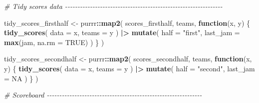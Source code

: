 \documentclass[
]{article}
\newenvironment{Shaded}{\begin{snugshade}}{\end{snugshade}}
\newcommand{\AttributeTok}[1]{\textcolor[rgb]{0.13,0.29,0.53}{#1}}
\newcommand{\CommentTok}[1]{\textcolor[rgb]{0.56,0.35,0.01}{\textit{#1}}}
\newcommand{\ConstantTok}[1]{\textcolor[rgb]{0.56,0.35,0.01}{#1}}
\newcommand{\ControlFlowTok}[1]{\textcolor[rgb]{0.13,0.29,0.53}{\textbf{#1}}}
\newcommand{\FunctionTok}[1]{\textcolor[rgb]{0.13,0.29,0.53}{\textbf{#1}}}
\newcommand{\NormalTok}[1]{#1}
\newcommand{\OtherTok}[1]{\textcolor[rgb]{0.56,0.35,0.01}{#1}}
\newcommand{\SpecialCharTok}[1]{\textcolor[rgb]{0.81,0.36,0.00}{\textbf{#1}}}
\newcommand{\StringTok}[1]{\textcolor[rgb]{0.31,0.60,0.02}{#1}}
\begin{document}
\begin{Shaded}
\begin{Highlighting}[]
\CommentTok{\# Tidy scores data {-}{-}{-}{-}{-}{-}{-}{-}{-}{-}{-}{-}{-}{-}{-}{-}{-}{-}{-}{-}{-}{-}{-}{-}{-}{-}{-}{-}{-}{-}{-}{-}{-}{-}{-}{-}{-}{-}{-}{-}{-}{-}{-}{-}{-}{-}{-}{-}{-}{-}{-}{-}{-}{-}{-}{-}{-}{-}{-}{-}{-}{-}{-}}

\NormalTok{tidy\_scores\_firsthalf }\OtherTok{\textless{}{-}}\NormalTok{ purrr}\SpecialCharTok{::}\FunctionTok{map2}\NormalTok{(}
\NormalTok{  scores\_firsthalf,}
\NormalTok{  teams,}
  \ControlFlowTok{function}\NormalTok{(x, y) \{}
    \FunctionTok{tidy\_scores}\NormalTok{(}
      \AttributeTok{data =}\NormalTok{ x,}
      \AttributeTok{teams =}\NormalTok{ y}
\NormalTok{    ) }\SpecialCharTok{|\textgreater{}} 
      \FunctionTok{mutate}\NormalTok{(}
        \AttributeTok{half =} \StringTok{"first"}\NormalTok{,}
        \AttributeTok{last\_jam =} \FunctionTok{max}\NormalTok{(jam, }\AttributeTok{na.rm =} \ConstantTok{TRUE}\NormalTok{)}
\NormalTok{      )}
\NormalTok{  \}}
\NormalTok{)}

\NormalTok{tidy\_scores\_secondhalf }\OtherTok{\textless{}{-}}\NormalTok{ purrr}\SpecialCharTok{::}\FunctionTok{map2}\NormalTok{(}
\NormalTok{  scores\_secondhalf,}
\NormalTok{  teams,}
  \ControlFlowTok{function}\NormalTok{(x, y) \{}
    \FunctionTok{tidy\_scores}\NormalTok{(}
      \AttributeTok{data =}\NormalTok{ x,}
      \AttributeTok{teams =}\NormalTok{ y}
\NormalTok{    ) }\SpecialCharTok{|\textgreater{}} 
      \FunctionTok{mutate}\NormalTok{(}
        \AttributeTok{half =} \StringTok{"second"}\NormalTok{,}
        \AttributeTok{last\_jam =} \ConstantTok{NA}
\NormalTok{      )}
\NormalTok{  \}}
\NormalTok{)}

\CommentTok{\# Scoreboard {-}{-}{-}{-}{-}{-}{-}{-}{-}{-}{-}{-}{-}{-}{-}{-}{-}{-}{-}{-}{-}{-}{-}{-}{-}{-}{-}{-}{-}{-}{-}{-}{-}{-}{-}{-}{-}{-}{-}{-}{-}{-}{-}{-}{-}{-}{-}{-}{-}{-}{-}{-}{-}{-}{-}{-}{-}{-}{-}{-}{-}{-}}


\end{Highlighting}
\end{Shaded}
\end{document}
